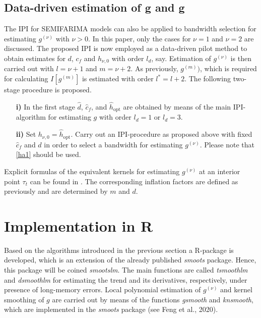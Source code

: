 \documentclass[12pt]{article}
\begin{document}

\subsection{Data-driven estimation of g\textquotesingle{} and g\textquotesingle \textquotesingle}
The IPI for SEMIFARIMA models can also be applied to bandwidth selection for estimating $g^{(\nu)}$ with $\nu > 0$. In this paper, only the cases for $\nu = 1$ and $\nu = 2$ are discussed. The proposed IPI is now employed as a data-driven pilot method to obtain estimates for $d$, $c_f$ and $h_{\nu, 0}$ with order $l_d$, say. Estimation of $g^{(\nu)}$ is then carried out with $l = \nu + 1$ and $m = \nu + 2$. As previously, $g^{(m)})$, which is required for calculating $I[g^{(m)}]$ is estimated with order $l^* = l + 2$. The following two-stage procedure is proposed.
\begin{itemize}
	\item[\textbf{i)}] In the first stage $\hat{d}$, $\hat{c}_f$, and $\hat{h}_{\text{opt}}$ are obtained by means of the main IPI-algorithm for estimating $g$ with order $l_d = 1$ or $l_d = 3$.
	
	\item[\textbf{ii)}] Set $h_{\nu,0} = \hat{h}_{\text{opt}}$. Carry out an IPI-procedure as proposed above with fixed $\hat{c}_f$ and $\hat{d}$ in order to select a bandwidth for estimating $g^{(\nu)}$. Please note that \eqref{ha1} should be used. 
\end{itemize}
Explicit formulas of the equivalent kernels for estimating $g^{(\nu)}$ at an interior point $\tau_t$ can be found in \citet{muller1988longitudinal}. The corresponding inflation factors are defined as previously and are determined by $m$ and $d$.

\section{Implementation in R}
Based on the algorithms introduced in the previous section a R-package is developed, which is an extension of the already published \textit{smoots} package. Hence, this package will be coined \textit{smootslm}. The main functions are called \textit{tsmoothlm} and \textit{dsmoothlm} for estimating the trend and its derivatives, respectively, under presence of long-memory errors. Local polynomial estimation of  $g^{(\nu)}$ and kernel smoothing of $g$ are carried out by means of the functions \textit{gsmooth} and \textit{knsmooth}, which are implemented in the \textit{smoots} package (see Feng et al., 2020).
\end{document}
